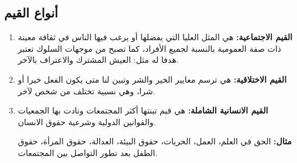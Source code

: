 \subsection{أنواع القيم}
\begin{enumerate}
    \item\textbf{القيم الاجتماعية:}
        هي المثل العليا التي يفضلها أو يرغب فيها الناس في ثقافة معينة ذات صفة
        العمومية بالنسبة لجميع الأفراد، كما تصبح من موجهات السلوك تعتبر هدفا له
        مثل: العيش المشترك والاعتراف بالآخر.
    \item\textbf{القيم الاختلاقية:}
        هي ترسم معايير الخير والشر وتبين لنا متى يكون الفعل خيرا أو شرا، وهي
        نسبية تختلف من شخص لآخر.
    \item\textbf{القيم الانسانية الشاملة:}
        هي قيم تبنتها أكثر المجتمعات ونادت بها الجمعيات والقوانين الدولية وشرعية
        حقوق الانسان.
        \smallskip
        
        \textbf{مثال:}
        الحق في العلم، العمل، الحريات، حقوق البيئة، العدالة، حقوق المرأة، حقوق
        الطفل بعد تطور التواصل بين المجتمعات.        
\end{enumerate}